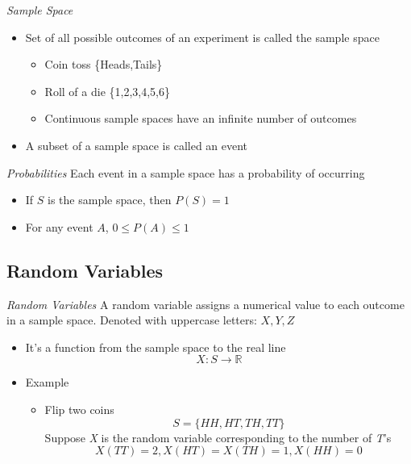 \emph{Sample Space}

 \begin{itemize}
  \item Set of all possible outcomes of an experiment is called the sample space
  \begin{itemize}
    \item Coin toss \{Heads,Tails\}
    \item Roll of a die \{1,2,3,4,5,6\}
    \item Continuous sample spaces have an infinite number of outcomes
  \end{itemize}
  \item A subset of a sample space is called an event
 \end{itemize}



\emph{Probabilities}
 Each event in a sample space has a probability of occurring
 \begin{itemize}
  \item If $S$ is the sample space, then $P(S) = 1$
  \item For any event $A$, $0 \le P(A) \le 1$
 \end{itemize}



\subsection{Random Variables}
\emph{Random Variables}
  A random variable assigns a numerical value to each outcome in a sample space.  Denoted with uppercase letters: $X, Y, Z$
  \begin{itemize}
    \item It's a function from the sample space to the real line
      \begin{equation*}
        X: S \to \mathbb{R}
      \end{equation*}
     \item Example
      \begin{itemize}
       \item Flip two coins
         \begin{equation*}
            S = \{HH,HT,TH,TT\}
         \end{equation*}
        Suppose \textit{X} is the random variable corresponding to the number of \textit{T}'s
         \begin{equation*}
           X(TT)=2, X(HT)=X(TH)=1, X(HH)=0
         \end{equation*}
      \end{itemize}
  \end{itemize}


